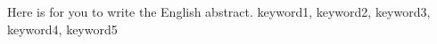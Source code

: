 
\eabstract
{
Here is for you to write the English abstract.
}
{keyword1, keyword2, keyword3, keyword4, keyword5}	%